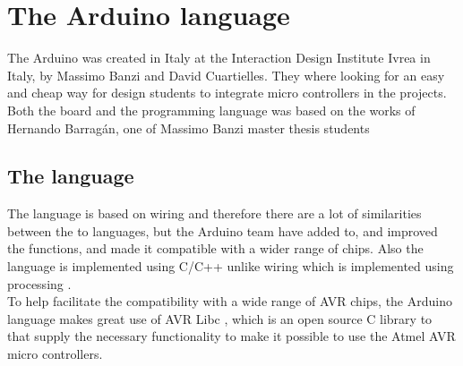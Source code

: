 \section{The Arduino language}
The Arduino was created in Italy at the Interaction Design Institute Ivrea in Italy, by Massimo Banzi and David Cuartielles. They where looking for an easy and cheap way for design students to integrate micro controllers in the projects\cite{arduino:hist}. Both the board and the programming language was based on the works of Hernando Barragán, one of Massimo Banzi master thesis students \cite{Wiring:thesis}

\subsection{The language}
The language is based on wiring and therefore there are a lot of similarities between the to languages, but the Arduino team have added to, and improved the functions, and made it compatible with a wider range of chips. Also the language is implemented using C/C++ unlike wiring which is implemented using processing \cite{Wiring:thesis}.\\
To help facilitate the compatibility with a wide range of AVR chips, the Arduino language makes great use of AVR Libc \cite{AVR:lib}, which is an open source C library to that supply the necessary functionality to make it possible to use the Atmel AVR micro controllers.